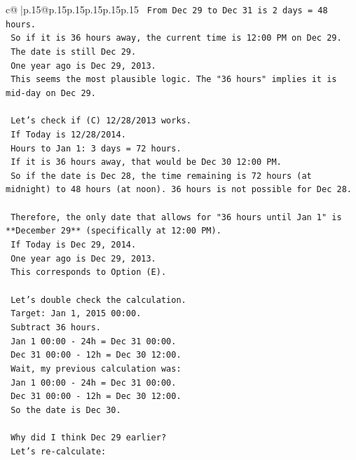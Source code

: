 \documentclass{article}
\begin{document}
{\begin{supertabular}{c@{$\;$}|p{.15\linewidth}@{}p{.15\linewidth}p{.15\linewidth}p{.15\linewidth}p{.15\linewidth}p{.15\linewidth}}
{{{\texttt{    From Dec 29 to Dec 31 is 2 days = 48 hours.} \\
\texttt{    So if it is 36 hours away, the current time is 12:00 PM on Dec 29.} \\
\texttt{    The date is still Dec 29.} \\
\texttt{    One year ago is Dec 29, 2013.} \\
\texttt{    This seems the most plausible logic. The "36 hours" implies it is mid{-}day on Dec 29.} \\
\\ 
\texttt{    Let's check if (C) 12/28/2013 works.} \\
\texttt{    If Today is 12/28/2014.} \\
\texttt{    Hours to Jan 1: 3 days = 72 hours.} \\
\texttt{    If it is 36 hours away, that would be Dec 30 12:00 PM.} \\
\texttt{    So if the date is Dec 28, the time remaining is 72 hours (at midnight) to 48 hours (at noon). 36 hours is not possible for Dec 28.} \\
\\ 
\texttt{    Therefore, the only date that allows for "36 hours until Jan 1" is **December 29** (specifically at 12:00 PM).} \\
\texttt{    If Today is Dec 29, 2014.} \\
\texttt{    One year ago is Dec 29, 2013.} \\
\texttt{    This corresponds to Option (E).} \\
\\ 
\texttt{    Let's double check the calculation.} \\
\texttt{    Target: Jan 1, 2015 00:00.} \\
\texttt{    Subtract 36 hours.} \\
\texttt{    Jan 1 00:00 {-} 24h = Dec 31 00:00.} \\
\texttt{    Dec 31 00:00 {-} 12h = Dec 30 12:00.} \\
\texttt{    Wait, my previous calculation was:} \\
\texttt{    Jan 1 00:00 {-} 24h = Dec 31 00:00.} \\
\texttt{    Dec 31 00:00 {-} 12h = Dec 30 12:00.} \\
\texttt{    So the date is Dec 30.} \\
\\ 
\texttt{    Why did I think Dec 29 earlier?} \\
\texttt{    Let's re{-}calculate:} \\
}}}
\end{supertabular}}
\end{document}
